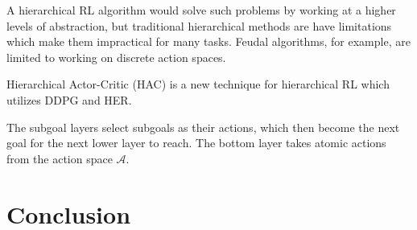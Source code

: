\documentclass[runningheads]{llncs}
\begin{document}
A hierarchical RL algorithm would solve such problems by working at a higher levels of abstraction, but traditional hierarchical methods are have limitations which make them impractical for many tasks. Feudal algorithms, for example, are limited to working on discrete action spaces.

Hierarchical Actor-Critic (HAC) \cite{levy2017hierarchical} is a new technique for hierarchical RL which utilizes DDPG and HER.

The subgoal layers select subgoals as their actions, which then become the next goal for the next lower layer to reach. The bottom layer takes atomic actions from the action space $\mathcal{A}$.

\section{Conclusion}

%
%



\end{document}
